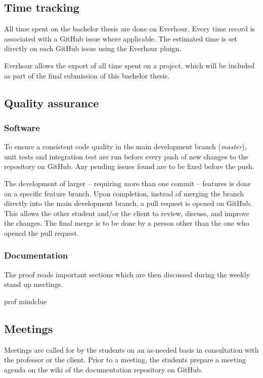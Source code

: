 \subsection{Time tracking}
All time spent on the bachelor thesis are done on Everhour. Every time record
is associated with a GitHub issue where applicable.
The estimated time is set directly on each GitHub issue using the Everhour pluign.

Everhour allows the export of all time spent on a project, which will be
included as part of the final submission of this bachelor thesis.

\subsection{Quality assurance}


\subsubsection{Software}
To ensure a consistent code quality in the main development branch
(\emph{master}), unit tests and integration test are run before every push of
new changes to the repository on GitHub. Any pending issues found are to be
fixed before the push.


The development of larger -- requiring more than one commit -- features is done
on a specific feature branch.  Upon completion, instead of merging the branch
directly into the main development branch, a pull request is opened on GitHub.
This allows the other student and/or the client to review, discuss, and improve
the changes. The final merge is to be done by a person other than the one who
opened the pull request.

\subsubsection{Documentation}
The proof reads important sections which are then discussed
during the weekly stand up meetings.

prof
mindclue



\subsection{Meetings}
Meetings are called for by the students on an as-needed basis in consultation
with the professor or the client. Prior to a meeting, the students prepare a meeting
agenda on the wiki of the documentation repository on GitHub.

